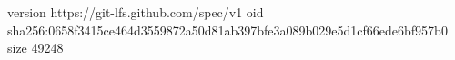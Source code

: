 version https://git-lfs.github.com/spec/v1
oid sha256:0658f3415ce464d3559872a50d81ab397bfe3a089b029e5d1cf66ede6bf957b0
size 49248
